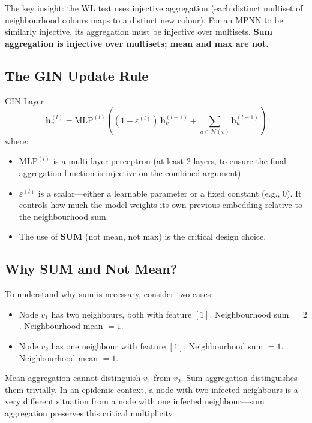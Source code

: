The key insight: the WL test uses injective aggregation (each distinct multiset of neighbourhood colours maps to a distinct new colour). For an MPNN to be similarly injective, its aggregation must be injective over multisets. \textbf{Sum aggregation is injective over multisets; mean and max are not.}

\subsection{The GIN Update Rule}

\begin{mathbox}{GIN Layer}
\begin{equation}
    \mathbf{h}_v^{(l)} = \text{MLP}^{(l)}\!\left((1 + \varepsilon^{(l)})\, \mathbf{h}_v^{(l-1)} + \sum_{u \in \mathcal{N}(v)} \mathbf{h}_u^{(l-1)}\right)
    \label{eq:gin}
\end{equation}
where:
\begin{itemize}[noitemsep]
    \item $\text{MLP}^{(l)}$ is a multi-layer perceptron (at least 2 layers, to ensure the final aggregation function is injective on the combined argument).
    \item $\varepsilon^{(l)}$ is a scalar---either a learnable parameter or a fixed constant (e.g., 0). It controls how much the model weights its own previous embedding relative to the neighbourhood sum.
    \item The use of \textbf{SUM} (not mean, not max) is the critical design choice.
\end{itemize}
\end{mathbox}

\subsection{Why SUM and Not Mean?}

To understand why sum is necessary, consider two cases:
\begin{itemize}
    \item Node $v_1$ has two neighbours, both with feature $[1]$. Neighbourhood sum $= 2$. Neighbourhood mean $= 1$.
    \item Node $v_2$ has one neighbour with feature $[1]$. Neighbourhood sum $= 1$. Neighbourhood mean $= 1$.
\end{itemize}
Mean aggregation cannot distinguish $v_1$ from $v_2$. Sum aggregation distinguishes them trivially. In an epidemic context, a node with two infected neighbours is a very different situation from a node with one infected neighbour---sum aggregation preserves this critical multiplicity.

